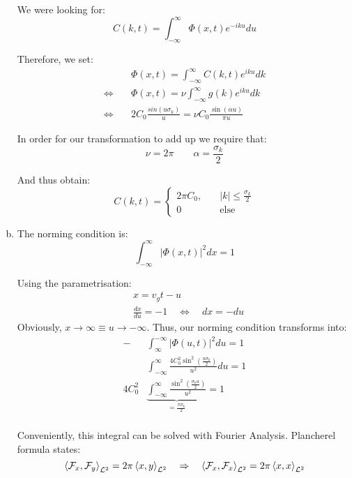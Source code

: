 \documentclass[a4paper,german,12pt,smallheadings]{scrartcl}
\begin{document}
\begin{enumerate}[a)]
We were looking for:
\begin{equation*}
C(k,t)=\int_{-\infty}^{\infty}\Phi(x,t)e^{-iku}du
\end{equation*}

Therefore, we set:
\begin{align*}
&\Phi(x,t)=\int_{-\infty}^{\infty}C(k,t)e^{iku}dk\\
\Leftrightarrow \quad &\Phi(x,t)=\nu\int_{-\infty}^{\infty}g(k)e^{iku}dk\\
\Leftrightarrow \quad & 2C_0\frac{sin(u\sigma_k)}{u}=\nu C_0\frac{\sin(\alpha u)}{\pi u}
\end{align*}

In order for our transformation to add up we require that:
\begin{equation*}
\nu=2\pi \quad \quad \alpha=\frac{\sigma_k}{2}
\end{equation*}

And thus obtain:
\begin{equation*}
C(k,t)=\begin{cases}2\pi C_0, \quad &|k|\le\frac{\sigma_k}{2}\\ 0 \quad &\text{else}
\end{cases}
\end{equation*}

\item The norming condition is:
\begin{equation*}
\int_{-\infty}^{\infty}|\Phi(x,t)|^2dx=1
\end{equation*}

Using the parametrisation:
\begin{align*}
&x=v_gt-u\\
&\frac{dx}{du}=-1 \quad \Leftrightarrow \quad dx=-du
\end{align*}
Obviously, $x\to\infty \equiv u\to-\infty$. Thus, our norming condition transforms into:
\begin{align*}
-&\int_{\infty}^{-\infty}|\Phi(u,t)|^2du=1\\
&\int_{-\infty}^{\infty}\frac{4C_0^2\sin^2(\frac{u\sigma_k}{2})}{u^2}du=1\\
 4C_0^2&\underbrace{\int_{-\infty}^{\infty}\frac{\sin^2(\frac{\sigma_k u}{2})}{u^2}}_{=\frac{\pi\sigma_k}{2}}=1\\
\end{align*}

Conveniently, this integral can be solved with Fourier Analysis. Plancherel formula states:
\begin{equation*}
\braket{\mathcal{F}_x,\mathcal{F}_y}_{\mathcal{L}^2}=2\pi\braket{x,y}_{\mathcal{L}^2} \quad \Rightarrow \quad \braket{\mathcal{F}_x,\mathcal{F}_x}_{\mathcal{L}^2}=2\pi\braket{x,x}_{\mathcal{L}^2}
\end{equation*}


\end{enumerate}
\end{document}
